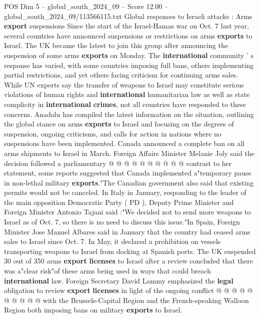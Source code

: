 \begin{textsample}{POS Dim 5 – global\_south\_2024\_09 – Score 12.00 – global\_south\_2024\_09/113566115.txt}  \label{ex:f5_pos_256}
Global responses to Israeli attacks : Arms \textbf{export} suspensions Since the start of the Israel-Hamas war on Oct. 7 last year, several countries have announced suspensions or restrictions on arms \textbf{exports} to Israel.
The UK became the latest to join this group after announcing the suspension of some arms \textbf{exports} on Monday.
The \textbf{international} community ' s response has varied, with some countries imposing full bans, others implementing partial restrictions, and yet others facing criticism for continuing arms sales.
While UN experts say the transfer of weapons to Israel may constitute serious violations of human rights and \textbf{international} humanitarian law as well as state complicity in \textbf{international} \textbf{crimes}, not all countries have responded to these concerns.
Anadolu has compiled the latest information on the situation, outlining the global stance on arms \textbf{exports} to Israel and focusing on the degrees of suspension, ongoing criticisms, and calls for action in nations where no suspensions have been implemented.
Canada announced a complete ban on all arms shipments to Israel in March.
Foreign Affairs Minister Melanie Joly said the decision followed a parliamentary @ @ @ @ @ @ @ @ @ @ contrast to her statement, some reports suggested that Canada implemented a"temporary pause in non-lethal military \textbf{exports}."The Canadian government also said that existing permits would not be canceled.
In Italy in January, responding to the leader of the main opposition Democratic Party ( PD ), Deputy Prime Minister and Foreign Minister Antonio Tajani said :"We decided not to send more weapons to Israel as of Oct. 7, so there is no need to discuss this issue."In Spain, Foreign Minister Jose Manuel Albares said in January that the country had ceased arms sales to Israel since Oct. 7.
In May, it declared a prohibition on vessels transporting weapons to Israel from docking at Spanish ports.
The UK suspended 30 out of 350 arms \textbf{export} \textbf{licenses} to Israel after a review concluded that there was a"clear risk"of these arms being used in ways that could breach \textbf{international} law.
Foreign Secretary David Lammy emphasized the \textbf{legal} obligation to review \textbf{export} \textbf{licenses} in light of the ongoing conflict @ @ @ @ @ @ @ @ @ @ with the Brussels-Capital Region and the French-speaking Walloon Region both imposing bans on military \textbf{exports} to Israel.

\end{textsample}
